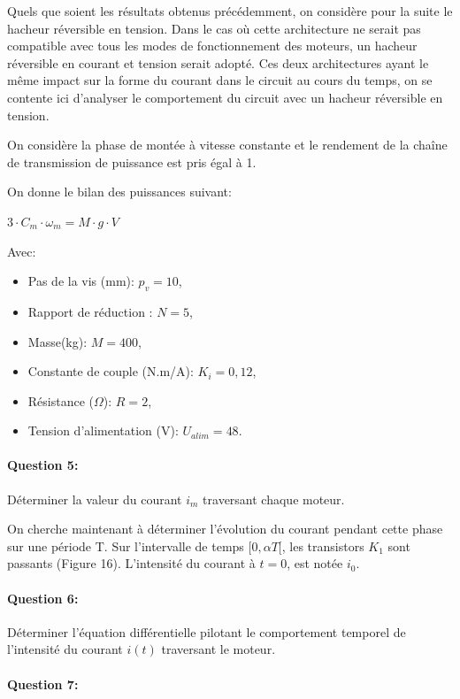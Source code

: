 Quels que soient les résultats obtenus précédemment, on considère pour la suite le hacheur réversible en
tension. Dans le cas où cette architecture ne serait pas compatible avec tous les modes de fonctionnement
des moteurs, un hacheur réversible en courant et tension serait adopté. Ces deux architectures ayant le même
impact sur la forme du courant dans le circuit au cours du temps, on se contente ici d'analyser le comportement
du circuit avec un hacheur réversible en tension.

On considère la phase de montée à vitesse constante et le rendement de la chaîne de transmission de
puissance est pris égal à 1.

On donne le bilan des puissances suivant:

$3\cdot C_m\cdot\omega_m=M\cdot g\cdot V$

Avec:
\begin{itemize}
 \item Pas de la vis (mm): $p_v=10$,
 \item Rapport de réduction : $N=5$,
 \item Masse(kg): $M=400$,
 \item Constante de couple (N.m/A): $K_i=0,12$,
 \item Résistance ($\Omega$): $R=2$,
 \item Tension d'alimentation (V): $U_{alim}=48$.
\end{itemize}

\paragraph{Question 5:}

Déterminer la valeur du courant $i_m$ traversant chaque moteur.

On cherche maintenant à déterminer l'évolution du courant pendant cette phase sur une période T. Sur l'intervalle de temps $[0,\alpha T[$, les transistors $K_1$ sont passants (Figure 16). L'intensité du courant à $t = 0$, est
notée $i_0$.

\paragraph{Question 6:}

Déterminer l'équation différentielle pilotant le comportement temporel de l'intensité du courant $i(t)$ traversant le moteur.

\paragraph{Question 7:}


